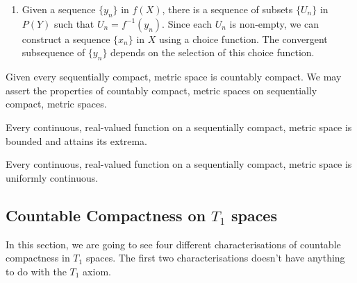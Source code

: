 \begin{remark}
	\begin{enumerate}
		\item Given a sequence $\{y_n\}$ in $f(X)$, there is a sequence of subsets $\{U_n\}$ in $P(Y)$ such that $U_n = f^{-1}(y_n)$.
			Since each $U_n$ is non-empty, we can construct a sequence $\{x_n\}$ in $X$ using a choice function.
			The convergent subsequence of $\{y_n\}$ depends on the selection of this choice function.
	\end{enumerate}
\end{remark}

Given every sequentially compact, metric space is countably compact.
We may assert the properties of countably compact, metric spaces on sequentially compact, metric spaces.

\begin{theorem}
	Every continuous, real-valued function on a sequentially compact, metric space is bounded and attains its extrema.
\end{theorem}

\begin{theorem}
	Every continuous, real-valued function on a sequentially compact, metric space is uniformly continuous.
	\cite[Exercises 11.1.6]{joshi}
\end{theorem}

\subsection{Countable Compactness on $T_1$ spaces}
	In this section, we are going to see four different characterisations of countable compactness in $T_1$ spaces.
	The first two characterisations doesn't have anything to do with the $T_1$ axiom.

